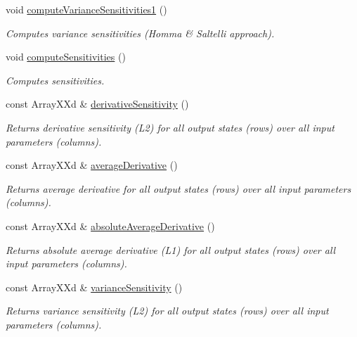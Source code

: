 \begin{DoxyCompactItemize}
void \hyperlink{class_go_s_u_m_1_1_c_sensitivity_analysis_a71c28b1b594d0774bb44eb37e3e437c9}{compute\-Variance\-Sensitivities1} ()
\begin{DoxyCompactList}\small\item\em Computes variance sensitivities (Homma \& Saltelli approach). \end{DoxyCompactList}\item 
void \hyperlink{class_go_s_u_m_1_1_c_sensitivity_analysis_a9b5c69ba4203f5c22434fc5890a34b5e}{compute\-Sensitivities} ()
\begin{DoxyCompactList}\small\item\em Computes sensitivities. \end{DoxyCompactList}\item 
const Array\-X\-Xd \& \hyperlink{class_go_s_u_m_1_1_c_sensitivity_analysis_aea2a3a12727bd5cd26157abd69088212}{derivative\-Sensitivity} ()
\begin{DoxyCompactList}\small\item\em Returns derivative sensitivity (L2) for all output states (rows) over all input parameters (columns). \end{DoxyCompactList}\item 
const Array\-X\-Xd \& \hyperlink{class_go_s_u_m_1_1_c_sensitivity_analysis_a945a3687a4b65ba63d27cae6a32c9c2a}{average\-Derivative} ()
\begin{DoxyCompactList}\small\item\em Returns average derivative for all output states (rows) over all input parameters (columns). \end{DoxyCompactList}\item 
const Array\-X\-Xd \& \hyperlink{class_go_s_u_m_1_1_c_sensitivity_analysis_a825fec4a36a7f107fc310a9a333b8fe8}{absolute\-Average\-Derivative} ()
\begin{DoxyCompactList}\small\item\em Returns absolute average derivative (L1) for all output states (rows) over all input parameters (columns). \end{DoxyCompactList}\item 
const Array\-X\-Xd \& \hyperlink{class_go_s_u_m_1_1_c_sensitivity_analysis_ab20cbf6e7fda3616769df651b2d79a7c}{variance\-Sensitivity} ()
\begin{DoxyCompactList}\small\item\em Returns variance sensitivity (L2) for all output states (rows) over all input parameters (columns). \end{DoxyCompactList}\item 

\end{DoxyCompactItemize}

